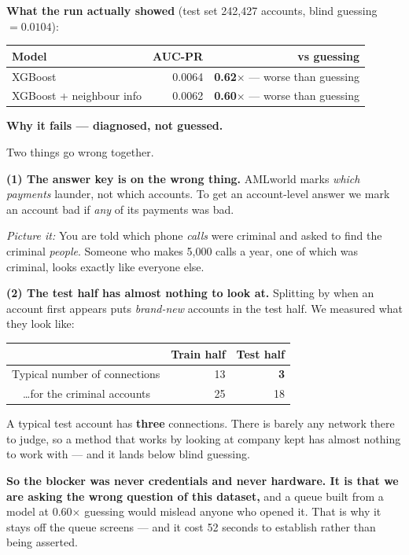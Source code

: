 \documentclass[11pt,a4paper]{article}
\newcommand{\pw}[1]{\textit{\textcolor{accent}{Picture it:}} #1}
\begin{document}
\textbf{What the run actually showed} (test set 242{,}427 accounts, blind
guessing $=0.0104$):

\begin{center}\small
\begin{tabular}{@{}lrr@{}}
\toprule
\textbf{Model} & \textbf{AUC-PR} & \textbf{vs guessing} \\
\midrule
XGBoost & 0.0064 & \textbf{0.62$\times$} --- worse than guessing \\
XGBoost + neighbour info & 0.0062 & \textbf{0.60$\times$} --- worse than guessing \\
\bottomrule
\end{tabular}
\end{center}

\begin{keybox}
\textbf{Why it fails --- diagnosed, not guessed.}

Two things go wrong together.

\textbf{(1) The answer key is on the wrong thing.} AMLworld marks \emph{which
payments} launder, not which accounts. To get an account-level answer we mark an
account bad if \emph{any} of its payments was bad.

\pw{You are told which phone \emph{calls} were criminal and asked to find the
criminal \emph{people}. Someone who makes 5{,}000 calls a year, one of which was
criminal, looks exactly like everyone else.}

\textbf{(2) The test half has almost nothing to look at.} Splitting by when an
account first appears puts \emph{brand-new} accounts in the test half. We
measured what they look like:

\begin{center}\small
\begin{tabular}{@{}lrr@{}}
\toprule
 & \textbf{Train half} & \textbf{Test half} \\
\midrule
Typical number of connections & 13 & \textbf{3} \\
\ \ …for the criminal accounts & 25 & 18 \\
\bottomrule
\end{tabular}
\end{center}

A typical test account has \textbf{three} connections. There is barely any
network there to judge, so a method that works by looking at company kept has
almost nothing to work with --- and it lands below blind guessing.

\textbf{So the blocker was never credentials and never hardware. It is that we
are asking the wrong question of this dataset,} and a queue built from a model
at 0.60$\times$ guessing would mislead anyone who opened it. That is why it stays
off the queue screens --- and it cost 52 seconds to establish rather than being
asserted.
\end{keybox}
\end{document}
